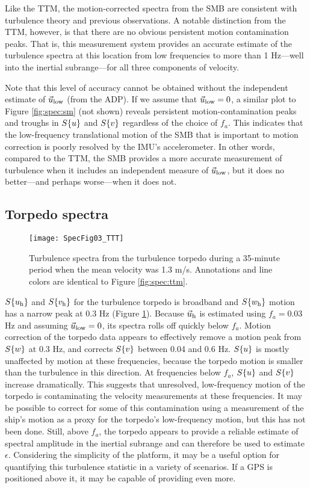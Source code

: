 Like the TTM, the motion-corrected spectra from the SMB are consistent with turbulence theory and previous observations. A notable distinction from the TTM, however, is that there are no obvious persistent motion contamination peaks. That is, this measurement system provides an accurate estimate of the turbulence spectra at this location from low frequencies to more than 1 Hz---well into the inertial subrange---for all three components of velocity.

Note that this level of accuracy cannot be obtained without the independent estimate of $\vec{u}_\mathrm{low}$ (from the ADP). If we assume that $\vec{u}_\mathrm{low}=0$, a similar plot to Figure \ref{fig:spec:sm} (not shown) reveals persistent motion-contamination peaks and troughs in $S\{u\}$ and $S\{v\}$ regardless of the choice of $f_a$. This indicates that the low-frequency translational motion of the SMB that is important to motion correction is poorly resolved by the IMU's accelerometer. In other words, compared to the TTM, the SMB provides a more accurate measurement of turbulence when it includes an independent measure of $\vec{u}_\mathrm{low}$, but it does no better---and perhaps worse---when it does not.

\subsection{Torpedo spectra}

\begin{figure}[t]
  \centering
  \texttt{[image: SpecFig03\_TTT]}
  \caption{Turbulence spectra from the turbulence torpedo during a 35-minute period when the mean velocity was 1.3 m/s. Annotations and line colors are identical to Figure \ref{fig:spec:ttm}.}
  \label{fig:spec:torpedo}
\end{figure}

$S\{u_{\mathrm{h}}\}$ and $S\{v_{\mathrm{h}}\}$ for the turbulence torpedo is broadband and $S\{w_{\mathrm{h}}\}$ motion has a narrow peak at 0.3 Hz (Figure \ref{fig:spec:torpedo}). Because $\vec{u}_{\mathrm{h}}$ is estimated using $f_a = 0.03$ Hz and assuming $\vec{u}_\mathrm{low}=0$, its spectra rolls off quickly below $f_a$.  Motion correction of the torpedo data appears to effectively remove a motion peak from $S\{w\}$ at 0.3 Hz, and corrects $S\{v\}$ between 0.04 and 0.6 Hz. $S\{u\}$ is mostly unaffected by motion at these frequencies, because the torpedo motion is smaller than the turbulence in this direction. At frequencies below $f_a$, $S\{u\}$ and $S\{v\}$ increase dramatically. This suggests that unresolved, low-frequency motion of the torpedo is contaminating the velocity measurements at these frequencies. It may be possible to correct for some of this contamination using a measurement of the ship's motion as a proxy for the torpedo's low-frequency motion, but this has not been done. Still, above $f_a$, the torpedo appears to provide a reliable estimate of spectral amplitude in the inertial subrange and can therefore be used to estimate $\epsilon$. Considering the simplicity of the platform, it may be a useful option for quantifying this turbulence statistic in a variety of scenarios. If a GPS is positioned above it, it may be capable of providing even more.


